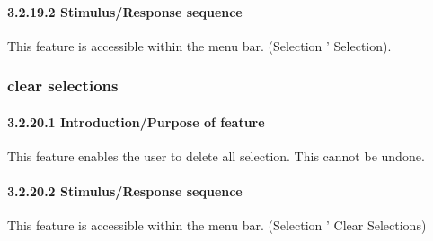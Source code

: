 \documentclass[titlepage,12pt]{scrartcl}
\begin{document}
\paragraph{3.2.19.2	Stimulus/Response sequence}
This feature is accessible within the menu bar. (Selection ' Selection).

\subsubsection{clear selections}
\paragraph{3.2.20.1	Introduction/Purpose of feature}
This feature enables the user to delete all selection. This cannot be undone. 
\paragraph{3.2.20.2	Stimulus/Response sequence}
This feature is accessible within the menu bar. (Selection ' Clear Selections)
\end{document}
